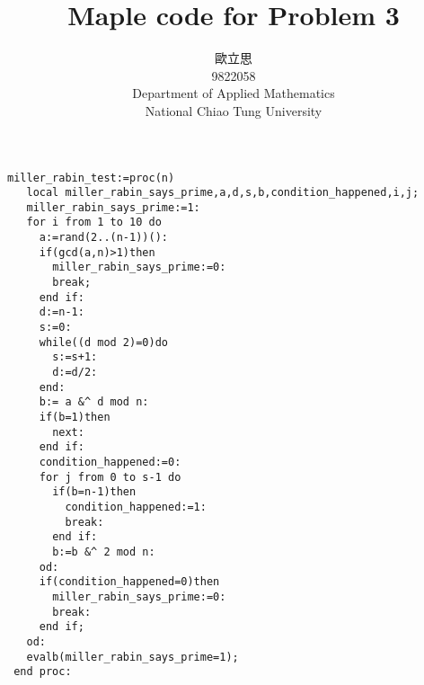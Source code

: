 \documentclass[8pt]{article} %
\title{Maple code for Problem 3}
\author{歐立思\\9822058\\Department of Applied Mathematics\\National Chiao Tung University}
\begin{document}
\begin{CJK}{UTF8}{bsmi}
\maketitle
\end{CJK}
\begin{lstlisting}
miller_rabin_test:=proc(n)
   local miller_rabin_says_prime,a,d,s,b,condition_happened,i,j;
   miller_rabin_says_prime:=1:
   for i from 1 to 10 do
     a:=rand(2..(n-1))():
     if(gcd(a,n)>1)then
       miller_rabin_says_prime:=0:
       break;
     end if:
     d:=n-1:
     s:=0:
     while((d mod 2)=0)do
       s:=s+1:
       d:=d/2:
     end:
     b:= a &^ d mod n:
     if(b=1)then
       next:
     end if:
     condition_happened:=0:
     for j from 0 to s-1 do
       if(b=n-1)then
         condition_happened:=1:
         break:
       end if:
       b:=b &^ 2 mod n:
     od:
     if(condition_happened=0)then
       miller_rabin_says_prime:=0:
       break:
     end if;
   od:
   evalb(miller_rabin_says_prime=1);
 end proc:
\end{lstlisting}
\end{document}
